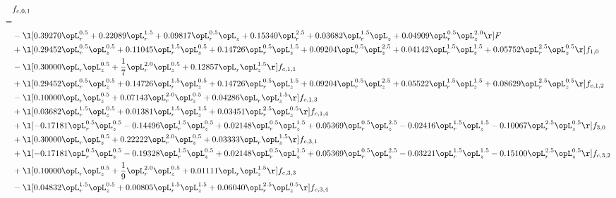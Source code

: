 \begin{alignat}{2} 
\label{eq:f_01_1} 
& f_{c,0,1} \nonumber \\ 
 = \\ 
& - \l[  0.39270 \opL_r^{0.5} +  0.22089 \opL_r^{1.5} +  0.09817 \opL_r^{0.5} \opL_z +  0.15340 \opL_r^{2.5} +  0.03682 \opL_r^{1.5} \opL_z +  0.04909 \opL_r^{0.5} \opL_z^{2.0}  \r] F \nonumber \\ 
& + \l[  0.29452 \opL_r^{0.5} \opL_z^{0.5} +  0.11045 \opL_r^{1.5} \opL_z^{0.5} +  0.14726 \opL_r^{0.5} \opL_z^{1.5} +  0.09204 \opL_r^{0.5} \opL_z^{2.5} +  0.04142 \opL_r^{1.5} \opL_z^{1.5} +  0.05752 \opL_r^{2.5} \opL_z^{0.5}  \r] f_{1,0} \nonumber \\ 
& - \l[  0.30000 \opL_r \opL_z^{0.5} + \frac{1}{7} \opL_r^{2.0} \opL_z^{0.5} +  0.12857 \opL_r \opL_z^{1.5}  \r] f_{c,1,1} \nonumber \\ 
& + \l[  0.29452 \opL_r^{0.5} \opL_z^{0.5} +  0.14726 \opL_r^{1.5} \opL_z^{0.5} +  0.14726 \opL_r^{0.5} \opL_z^{1.5} +  0.09204 \opL_r^{0.5} \opL_z^{2.5} +  0.05522 \opL_r^{1.5} \opL_z^{1.5} +  0.08629 \opL_r^{2.5} \opL_z^{0.5}  \r] f_{c,1,2} \nonumber \\ 
& - \l[  0.10000 \opL_r \opL_z^{0.5} +  0.07143 \opL_r^{2.0} \opL_z^{0.5} +  0.04286 \opL_r \opL_z^{1.5}  \r] f_{c,1,3} \nonumber \\ 
& + \l[  0.03682 \opL_r^{1.5} \opL_z^{0.5} +  0.01381 \opL_r^{1.5} \opL_z^{1.5} +  0.03451 \opL_r^{2.5} \opL_z^{0.5}  \r] f_{c,1,4} \nonumber \\ 
& + \l[  -0.17181 \opL_r^{0.5} \opL_z^{0.5}   -0.14496 \opL_r^{1.5} \opL_z^{0.5} +  0.02148 \opL_r^{0.5} \opL_z^{1.5} +  0.05369 \opL_r^{0.5} \opL_z^{2.5}   -0.02416 \opL_r^{1.5} \opL_z^{1.5}   -0.10067 \opL_r^{2.5} \opL_z^{0.5}  \r] f_{3,0} \nonumber \\ 
& + \l[  0.30000 \opL_r \opL_z^{0.5} +  0.22222 \opL_r^{2.0} \opL_z^{0.5} +  0.03333 \opL_r \opL_z^{1.5}  \r] f_{c,3,1} \nonumber \\ 
& + \l[  -0.17181 \opL_r^{0.5} \opL_z^{0.5}   -0.19328 \opL_r^{1.5} \opL_z^{0.5} +  0.02148 \opL_r^{0.5} \opL_z^{1.5} +  0.05369 \opL_r^{0.5} \opL_z^{2.5}   -0.03221 \opL_r^{1.5} \opL_z^{1.5}   -0.15100 \opL_r^{2.5} \opL_z^{0.5}  \r] f_{c,3,2} \nonumber \\ 
& + \l[  0.10000 \opL_r \opL_z^{0.5} + \frac{1}{9} \opL_r^{2.0} \opL_z^{0.5} +  0.01111 \opL_r \opL_z^{1.5}  \r] f_{c,3,3} \nonumber \\ 
& - \l[  0.04832 \opL_r^{1.5} \opL_z^{0.5} +  0.00805 \opL_r^{1.5} \opL_z^{1.5} +  0.06040 \opL_r^{2.5} \opL_z^{0.5}  \r] f_{c,3,4} \nonumber \\ 

\end{alignat}
